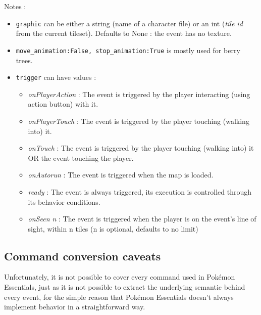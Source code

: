 \documentclass[11pt]{article}
\begin{document}
{Notes :
\begin{itemize}
	\item \verb|graphic| can be either a string (name of a character file) or an int (\textit{tile id} from the current tileset). Defaults to None : the event has no texture.
	
	\item \verb|move_animation:False, stop_animation:True| is mostly used for berry trees.
	
	\item \verb|trigger| can have values : 
	\begin{itemize}
		\item \textit{onPlayerAction} : The event is triggered by the player interacting (using action button) with it.
		
		\item \textit{onPlayerTouch} : The event is triggered by the player touching (walking into) it.
		
		\item \textit{onTouch} : The event is triggered by the player touching (walking into) it OR the event touching the player.
		
		\item \textit{onAutorun} : The event is triggered when the map is loaded.
		
		\item \textit{ready} : The event is always triggered, its execution is controlled through its behavior conditions.
		
		\item \textit{onSeen n} : The event is triggered when the player is on the event's line of sight, within n tiles (n is optional, defaults to no limit)
	\end{itemize}
	
\end{itemize}







\newpage
\subsection{Command conversion caveats} %

Unfortunately, it is not possible to cover every command used in Pokémon Essentials, just as it is not possible to extract the underlying semantic behind every event, for the simple reason that Pokémon Essentials doesn't always implement behavior in a straightforward way.

}
\end{document}
